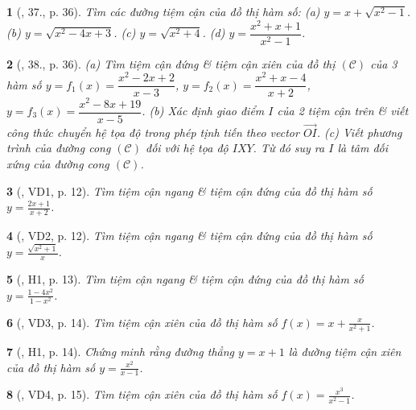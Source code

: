 \documentclass{article}
\newtheorem{baitoan}{}
\begin{document}
\begin{baitoan}[\cite{SGK_Toan_12_giai_tich_nang_cao}, 37., p. 36]
	Tìm các đường tiệm cận của đồ thị hàm số: (a) $y = x + \sqrt{x^2 - 1}$. (b) $y = \sqrt{x^2 - 4x + 3}$. (c) $y = \sqrt{x^2 + 4}$. (d) $y = \dfrac{x^2 + x + 1}{x^2 - 1}$.
\end{baitoan}

\begin{baitoan}[\cite{SGK_Toan_12_giai_tich_nang_cao}, 38., p. 36]
	(a) Tìm tiệm cận đứng \& tiệm cận xiên của đồ thị $(\mathcal{C})$ của 3 hàm số $y = f_1(x) = \dfrac{x^2 - 2x + 2}{x - 3}$, $y = f_2(x) = \dfrac{x^2 + x - 4}{x + 2}$, $y = f_3(x) = \dfrac{x^2 - 8x + 19}{x - 5}$. (b) Xác định giao điểm $I$ của 2 tiệm cận trên \& viết công thức chuyển hệ tọa độ trong phép tịnh tiến theo vector $\overrightarrow{OI}$. (c) Viết phương trình của đường cong $(\mathcal{C})$ đối với hệ tọa độ $IXY$. Từ đó suy ra $I$ là tâm đối xứng của đường cong $(\mathcal{C})$.
\end{baitoan}

\begin{baitoan}[\cite{TLCT_giai_tich_12}, VD1, p. 12]
	Tìm tiệm cận ngang \& tiệm cận đứng của đồ thị hàm số $y = \frac{2x + 1}{x + 2}$.
\end{baitoan}

\begin{baitoan}[\cite{TLCT_giai_tich_12}, VD2, p. 12]
	Tìm tiệm cận ngang \& tiệm cận đứng của đồ thị hàm số $y = \frac{\sqrt{x^2 + 1}}{x}$.
\end{baitoan}

\begin{baitoan}[\cite{TLCT_giai_tich_12}, H1, p. 13]
	Tìm tiệm cận ngang \& tiệm cận đứng của đồ thị hàm số $y = \frac{1 - 4x^2}{1 - x^2}$.
\end{baitoan}

\begin{baitoan}[\cite{TLCT_giai_tich_12}, VD3, p. 14]
	Tìm tiệm cận xiên của đồ thị hàm số $f(x) = x + \frac{x}{x^2 + 1}$.
\end{baitoan}

\begin{baitoan}[\cite{TLCT_giai_tich_12}, H1, p. 14]
	Chứng minh rằng đường thẳng $y = x + 1$ là đường tiệm cận xiên của đồ thị hàm số $y = \frac{x^2}{x - 1}$.
\end{baitoan}

\begin{baitoan}[\cite{TLCT_giai_tich_12}, VD4, p. 15]
	Tìm tiệm cận xiên của đồ thị hàm số $f(x) = \frac{x^3}{x^2 - 1}$.
\end{baitoan}
\end{document}
